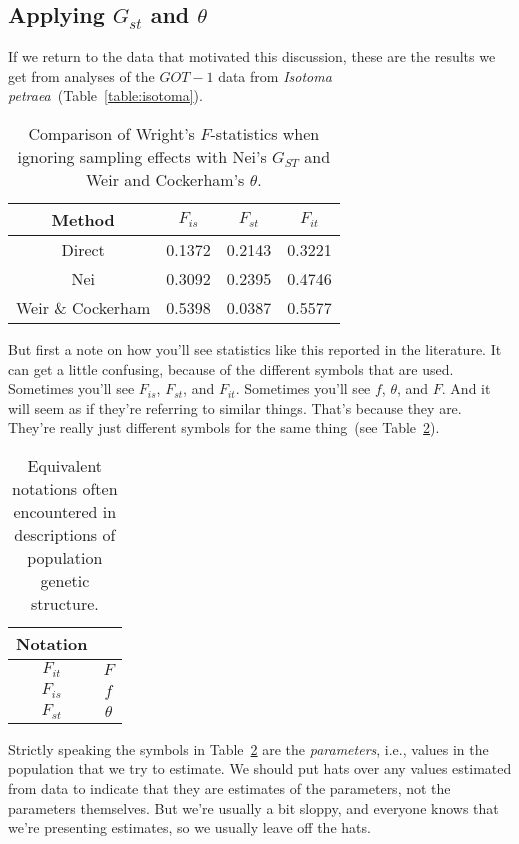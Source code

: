 \documentclass[12pt]{article}
\begin{document}
\subsection*{Applying $G_{st}$ and $\theta$}

If we return to the data that motivated this discussion, these are the
results we get from analyses of the $GOT-1$ data from {\it Isotoma
  petraea}~(Table~\ref{table:isotoma}). 
\begin{table}
\begin{center}
  \begin{tabular}{c|ccc}
\hline\hline
Method & $F_{is}$ & $F_{st}$ & $F_{it}$ \\
\hline
Direct            & 0.1372 & 0.2143 & 0.3221 \\
Nei               & 0.3092 & 0.2395 & 0.4746 \\
Weir \& Cockerham & 0.5398 & 0.0387 & 0.5577 \\
\hline
\end{tabular}
\end{center}
\caption{Comparison of Wright's $F$-statistics when ignoring sampling
  effects with Nei's $G_{ST}$ and Weir and Cockerham's $\theta$.}\label{table:fst-comparison}
\end{table}
But first a note on how you'll see statistics like this reported in
the literature. It can get a little confusing, because of the
different symbols that are used. Sometimes you'll see $F_{is}$,
$F_{st}$, and $F_{it}$. Sometimes you'll see $f$, $\theta$, and
$F$. And it will seem as if they're referring to similar
things. That's because they are. They're really just different symbols
for the same thing~(see
Table~\ref{table:fst-theta}).
\begin{table}
\begin{center}
\begin{tabular}{cc}
\hline\hline
Notation \\
\hline
$F_{it}$ & $F$ \\
$F_{is}$ & $f$ \\
$F_{st}$ & $\theta$ \\
\hline
\end{tabular}
\end{center}
\caption{Equivalent notations often encountered in descriptions of
  population genetic structure.}\label{table:fst-theta}
\end{table}
Strictly speaking the symbols in Table~\ref{table:fst-theta} are the
{\it parameters}, i.e., values in the population that we try to
estimate. We should put hats over any values estimated from data to
indicate that they are estimates of the parameters, not the parameters
themselves. But we're usually a bit sloppy, and everyone knows that
we're presenting estimates, so we usually leave off the hats.
\end{document}
